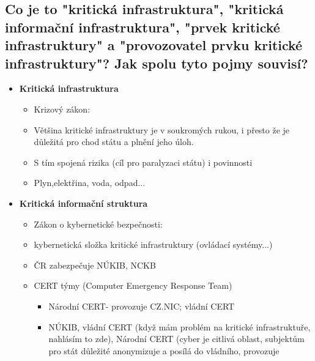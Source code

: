 \subsection{Co je to "kritická infrastruktura", "kritická informační infrastruktura", "prvek kritické infrastruktury" a "provozovatel prvku kritické infrastruktury"? Jak spolu tyto pojmy souvisí?}
\begin{itemize}
    \item \textbf{Kritická infrastruktura}
          \begin{itemize}
              \item Krizový zákon: 
              \item Většina kritické infrastruktury je v soukromých rukou, i přesto že je důležitá pro chod státu a plnění jeho úloh.
              \item S tím spojená rizika (cíl pro paralyzaci státu) i povinnosti
              \item Plyn,elektřina, voda, odpad...
          \end{itemize}
    \item \textbf{Kritická informační struktura}
          \begin{itemize}
              \item Zákon o kybernetické bezpečnosti: 
              \item kybernetická složka kritické infrastruktury (ovládací systémy...)
              \item ČR zabezpečuje NÚKIB, NCKB
              \item CERT týmy (Computer Emergency Response Team)
                    \begin{itemize}
                        \item Národní CERT- provozuje CZ.NIC; vládní CERT
                        \item NÚKIB, vládní CERT (když mám problém na kritické infrastruktuře, nahlásím to zde), Národní CERT
                              (cyber je citlivá oblast, subjektům pro stát důležité anonymizuje a posílá do vládního, provozuje

\end{itemize}
\end{itemize}
\end{itemize}
